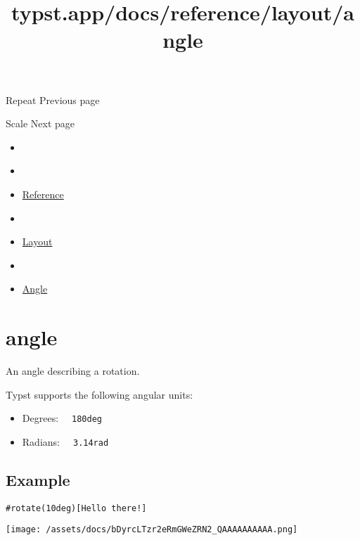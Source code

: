 { Repeat } { Previous page }

\href{/docs/reference/layout/scale/}{\pandocbounded{}}

{ Scale } { Next page }


\title{typst.app/docs/reference/layout/angle}

\begin{itemize}
\tightlist
\item
  \href{/docs}{}
\item
  
\item
  \href{/docs/reference/}{Reference}
\item
  
\item
  \href{/docs/reference/layout/}{Layout}
\item
  
\item
  \href{/docs/reference/layout/angle/}{Angle}
\end{itemize}

\section{\texorpdfstring{{ angle }}{ angle }}\label{summary}

An angle describing a rotation.

Typst supports the following angular units:

\begin{itemize}
\tightlist
\item
  Degrees: \texttt{\ }{\texttt{\ 180deg\ }}\texttt{\ }
\item
  Radians: \texttt{\ }{\texttt{\ 3.14rad\ }}\texttt{\ }
\end{itemize}

\subsection{Example}\label{example}

\begin{verbatim}
#rotate(10deg)[Hello there!]
\end{verbatim}

\texttt{[image: /assets/docs/bDyrcLTzr2eRmGWeZRN2\_QAAAAAAAAAA.png]}


